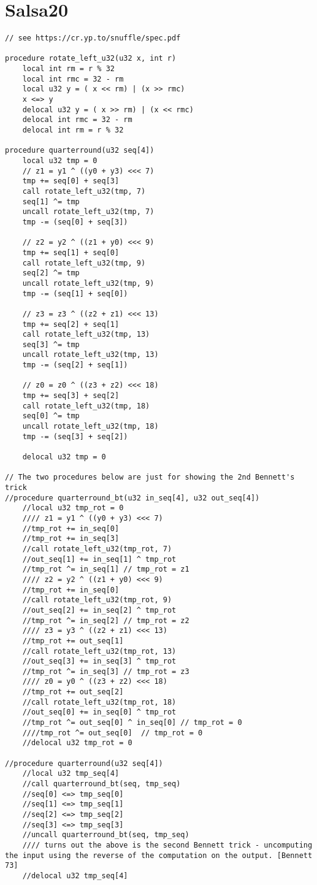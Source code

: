 \documentclass[a4paper,10pt,openright]{memoir}
\begin{document}
\section{Salsa20}
\begin{lstlisting}[language=Janus,breaklines=true]
// see https://cr.yp.to/snuffle/spec.pdf

procedure rotate_left_u32(u32 x, int r)
    local int rm = r % 32
    local int rmc = 32 - rm
    local u32 y = ( x << rm) | (x >> rmc)
    x <=> y
    delocal u32 y = ( x >> rm) | (x << rmc)
    delocal int rmc = 32 - rm
    delocal int rm = r % 32

procedure quarterround(u32 seq[4])
	local u32 tmp = 0
	// z1 = y1 ^ ((y0 + y3) <<< 7)
	tmp += seq[0] + seq[3]
	call rotate_left_u32(tmp, 7)
	seq[1] ^= tmp
	uncall rotate_left_u32(tmp, 7)
	tmp -= (seq[0] + seq[3])
	
	// z2 = y2 ^ ((z1 + y0) <<< 9)
	tmp += seq[1] + seq[0]
	call rotate_left_u32(tmp, 9)
	seq[2] ^= tmp
	uncall rotate_left_u32(tmp, 9)
	tmp -= (seq[1] + seq[0])
  
	// z3 = z3 ^ ((z2 + z1) <<< 13)
	tmp += seq[2] + seq[1]
	call rotate_left_u32(tmp, 13)
	seq[3] ^= tmp
	uncall rotate_left_u32(tmp, 13)
	tmp -= (seq[2] + seq[1])
  
	// z0 = z0 ^ ((z3 + z2) <<< 18)
	tmp += seq[3] + seq[2]
	call rotate_left_u32(tmp, 18)
	seq[0] ^= tmp
	uncall rotate_left_u32(tmp, 18)
	tmp -= (seq[3] + seq[2])
  
	delocal u32 tmp = 0

// The two procedures below are just for showing the 2nd Bennett's trick
//procedure quarterround_bt(u32 in_seq[4], u32 out_seq[4])
	//local u32 tmp_rot = 0
	//// z1 = y1 ^ ((y0 + y3) <<< 7)
	//tmp_rot += in_seq[0]
	//tmp_rot += in_seq[3]
	//call rotate_left_u32(tmp_rot, 7)
	//out_seq[1] += in_seq[1] ^ tmp_rot
	//tmp_rot ^= in_seq[1] // tmp_rot = z1
	//// z2 = y2 ^ ((z1 + y0) <<< 9)
	//tmp_rot += in_seq[0]
	//call rotate_left_u32(tmp_rot, 9)
	//out_seq[2] += in_seq[2] ^ tmp_rot
	//tmp_rot ^= in_seq[2] // tmp_rot = z2
	//// z3 = y3 ^ ((z2 + z1) <<< 13)
	//tmp_rot += out_seq[1]
	//call rotate_left_u32(tmp_rot, 13)
	//out_seq[3] += in_seq[3] ^ tmp_rot
	//tmp_rot ^= in_seq[3] // tmp_rot = z3
	//// z0 = y0 ^ ((z3 + z2) <<< 18)
	//tmp_rot += out_seq[2]
	//call rotate_left_u32(tmp_rot, 18)
	//out_seq[0] += in_seq[0] ^ tmp_rot
	//tmp_rot ^= out_seq[0] ^ in_seq[0] // tmp_rot = 0
	////tmp_rot ^= out_seq[0]  // tmp_rot = 0
	//delocal u32 tmp_rot = 0

//procedure quarterround(u32 seq[4])
	//local u32 tmp_seq[4]
	//call quarterround_bt(seq, tmp_seq)
	//seq[0] <=> tmp_seq[0]
	//seq[1] <=> tmp_seq[1]
	//seq[2] <=> tmp_seq[2]
	//seq[3] <=> tmp_seq[3]
	//uncall quarterround_bt(seq, tmp_seq)
	//// turns out the above is the second Bennett trick - uncomputing the input using the reverse of the computation on the output. [Bennett 73]
	//delocal u32 tmp_seq[4]


\end{lstlisting}
\end{document}
